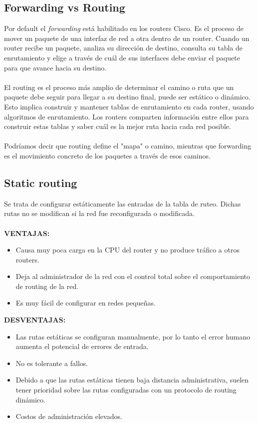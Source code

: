 \documentclass{article}
\begin{document}
\subsection{Forwarding vs Routing}
Por default el \textit{forwarding} está habilitado en los routers Cisco. Es el proceso de mover un paquete de una interfaz de red a otra dentro de un router. Cuando un router recibe un paquete, analiza su dirección de destino, consulta su tabla de enrutamiento y elige a través de cuál de sus interfaces debe enviar el paquete para que avance hacia su destino.
\\\\
El routing es el proceso más amplio de determinar el camino o ruta que un paquete debe seguir para llegar a su destino final, puede ser estático o dinámico. Esto implica construir y mantener tablas de enrutamiento en cada router, usando algoritmos de enrutamiento. Los routers comparten información entre ellos para construir estas tablas y saber cuál es la mejor ruta hacia cada red posible.
\\\\
Podríamos decir que routing define el "mapa" o camino, mientras que forwarding es el movimiento concreto de los paquetes a través de esos caminos.

\subsection{Static routing}
Se trata de configurar estáticamente las entradas de la tabla de ruteo. Dichas rutas no se modifican si la red fue reconfigurada o modificada.
\\\\
\textbf{VENTAJAS:}
\begin{itemize}
    \item Causa muy poca carga en la CPU del router y no produce tráfico a otros routers. 
    \item Deja al administrador de la red con el control total sobre el comportamiento de routing de
 la red.
 \item Es muy fácil de configurar en redes pequeñas.
\end{itemize}
\textbf{DESVENTAJAS:}
\begin{itemize}
    \item Las rutas estáticas se configuran manualmente, por lo tanto el error humano aumenta el potencial de errores de entrada.
    \item No es tolerante a fallos.
    \item Debido a que las rutas estáticas tienen baja distancia administrativa, suelen tener prioridad
 sobre las rutas configuradas con un protocolo de routing dinámico.
 \item  Costos de administración elevados.
\end{itemize}
\end{document}
